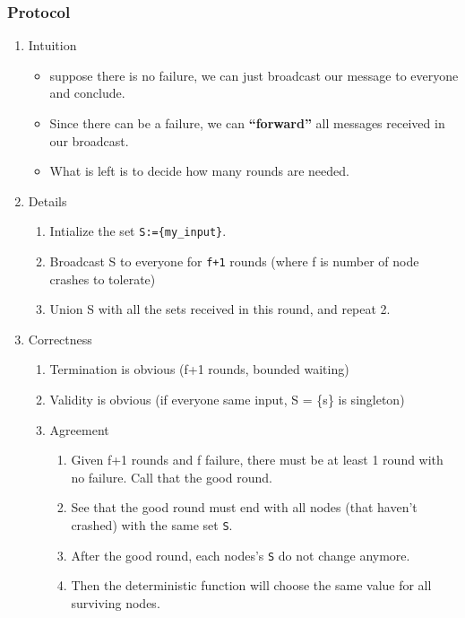 \documentclass[11pt]{article}
\begin{document}
\subsubsection{Protocol}
\label{sec:org41c2aaa}
\begin{enumerate}
\item Intuition
\label{sec:org5dc1d74}
\begin{itemize}
\item suppose there is no failure, we can just broadcast our message to everyone and conclude.
\item Since there can be a failure, we can \textbf{``forward''} all messages received in our broadcast.
\item What is left is to decide how many rounds are needed.
\end{itemize}
\item Details
\label{sec:orgd79cb2f}
\begin{enumerate}
\item Intialize the set \texttt{S:=\{my\_input\}}.
\item Broadcast S to everyone for \texttt{f+1} rounds (where f is number of node crashes
to tolerate)
\item Union S with all the sets received in this round, and repeat 2.
\end{enumerate}
\item Correctness
\label{sec:org3ec9a9c}
\begin{enumerate}
\item Termination is obvious (f+1 rounds, bounded waiting)
\label{sec:orga4ac639}
\item Validity is obvious (if everyone same input, S = \{s\} is singleton)
\label{sec:orgc89be21}
\item Agreement
\label{sec:orgaea8d4f}
\begin{enumerate}
\item Given f+1 rounds and f failure, there must be at least 1 round with no
failure. Call that the good round.
\item See that the good round must end with all nodes (that haven't crashed) with
the same set \texttt{S}.
\item After the good round, each nodes's \texttt{S} do not change anymore.
\item Then the deterministic function will choose the same value for all surviving
nodes.
\end{enumerate}
\end{enumerate}
\end{enumerate}
\end{document}
